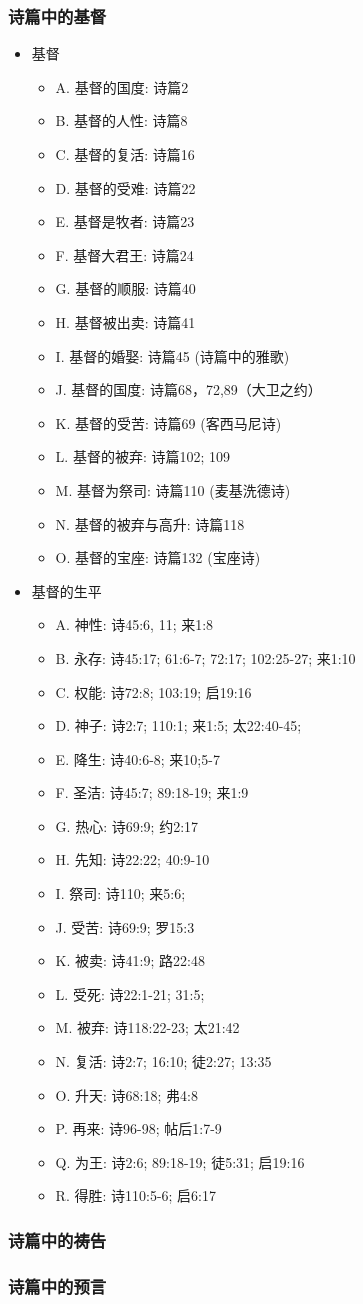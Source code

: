 \subsubsection{诗篇中的基督}
\begin{itemize}
\item 基督
\begin{itemize}
\itemsep-.45em  
\item A.  基督的国度: 诗篇2
\item B.  基督的人性: 诗篇8
\item C.  基督的复活: 诗篇16
\item D.  基督的受难: 诗篇22
\item E.  基督是牧者: 诗篇23
\item F.  基督大君王: 诗篇24
\item G.  基督的顺服: 诗篇40
\item H.  基督被出卖: 诗篇41
\item I.  基督的婚娶: 诗篇45 (诗篇中的雅歌)
\item J.  基督的国度: 诗篇68，72,89（大卫之约）
\item K.  基督的受苦: 诗篇69 (客西马尼诗)
\item L.  基督的被弃: 诗篇102; 109
\item M.  基督为祭司: 诗篇110 (麦基洗德诗)
\item N.  基督的被弃与高升: 诗篇118
\item O.  基督的宝座: 诗篇132 (宝座诗) 
\end{itemize}
\item 基督的生平
\begin{itemize}
\itemsep-.45em  
\item A.  神性: 诗45:6, 11; 来1:8
\item B.  永存: 诗45:17; 61:6-7; 72:17; 102:25-27; 来1:10
\item C.  权能: 诗72:8; 103:19; 启19:16
\item D.  神子: 诗2:7; 110:1; 来1:5; 太22:40-45;
\item E.  降生: 诗40:6-8; 来10;5-7
\item F.  圣洁: 诗45:7; 89:18-19; 来1:9
\item G.  热心: 诗69:9; 约2:17
\item H.  先知: 诗22:22; 40:9-10
\item I.  祭司: 诗110; 来5:6;
\item J.  受苦: 诗69:9; 罗15:3
\item K.  被卖: 诗41:9; 路22:48
\item L.  受死: 诗22:1-21; 31:5;
\item M.  被弃: 诗118:22-23; 太21:42
\item N.  复活: 诗2:7; 16:10; 徒2:27; 13:35
\item O.  升天: 诗68:18; 弗4:8
\item P.  再来: 诗96-98; 帖后1:7-9
\item Q. 为王: 诗2:6; 89:18-19; 徒5:31; 启19:16
\item R.  得胜: 诗110:5-6; 启6:17
\end{itemize}
\end{itemize}

\subsubsection{诗篇中的祷告}

\subsubsection{诗篇中的预言}


